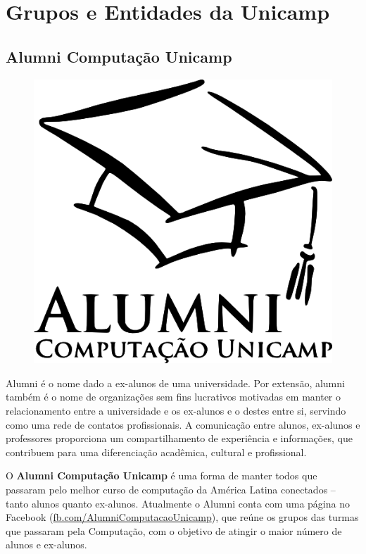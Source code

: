 
\section{Grupos e Entidades da Unicamp}

\subsection{Alumni Computação Unicamp}

\begin{figure}[H]
    \centering
    \includegraphics[scale=0.40]{img/alem_da_graduacao/alumni_logo.png}
\end{figure}

Alumni é o nome dado a ex-alunos de uma universidade. Por extensão, alumni
também é o nome de organizações sem fins lucrativos motivadas em manter o
relacionamento entre a universidade e os ex-alunos e o destes entre si, servindo
como uma rede de contatos profissionais. A comunicação entre alunos, ex-alunos e
professores proporciona um compartilhamento de experiência e informações, que
contribuem para uma diferenciação acadêmica, cultural e profissional.

O \textbf{Alumni Computação Unicamp} é uma forma de manter todos que passaram
pelo melhor curso de computação da América Latina conectados -- tanto alunos
quanto ex-alunos. Atualmente o Alumni conta com uma página no Facebook
(\url{fb.com/AlumniComputacaoUnicamp}), que reúne os grupos das turmas que
passaram pela Computação, com o objetivo de atingir o maior número de alunos e
ex-alunos.

